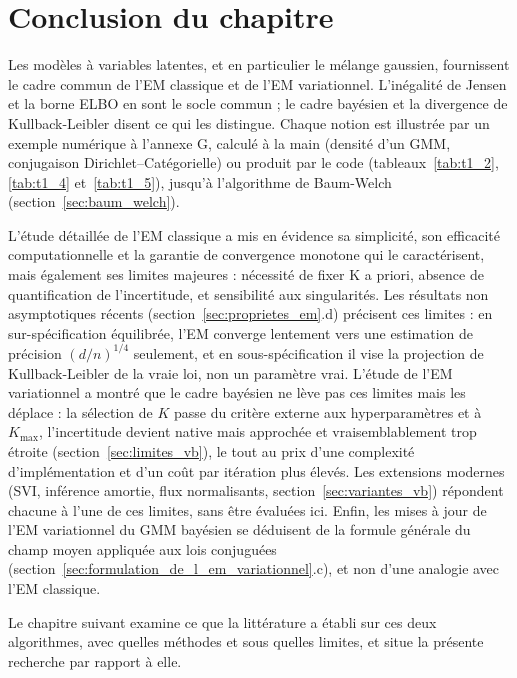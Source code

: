 \section{Conclusion du chapitre}\label{sec:conclusion_du_chapitre_1}
Les modèles à variables latentes, et en particulier le mélange gaussien, fournissent le cadre commun de l'EM classique et de l'EM variationnel. L'inégalité de Jensen et la borne ELBO en sont le socle commun ; le cadre bayésien et la divergence de Kullback-Leibler disent ce qui les distingue. Chaque notion est illustrée par un exemple numérique à l'annexe G, calculé à la main (densité d'un GMM, conjugaison Dirichlet--Catégorielle) ou produit par le code (tableaux~\ref{tab:t1_2}, \ref{tab:t1_4} et~\ref{tab:t1_5}), jusqu'à l'algorithme de Baum-Welch (section~\ref{sec:baum_welch}).

L'étude détaillée de l'EM classique a mis en évidence sa simplicité, son efficacité computationnelle et la garantie de convergence monotone qui le caractérisent, mais également ses limites majeures : nécessité de fixer K a priori, absence de quantification de l'incertitude, et sensibilité aux singularités. Les résultats non asymptotiques récents (section~\ref{sec:proprietes_em}.d) précisent ces limites : en sur-spécification équilibrée, l'EM converge lentement vers une estimation de précision $(d/n)^{1/4}$ seulement, et en sous-spécification il vise la projection de Kullback-Leibler de la vraie loi, non un paramètre vrai. L'étude de l'EM variationnel a montré que le cadre bayésien ne lève pas ces limites mais les déplace : la sélection de $K$ passe du critère externe aux hyperparamètres et à $K_{\max}$, l'incertitude devient native mais approchée et vraisemblablement trop étroite (section~\ref{sec:limites_vb}), le tout au prix d'une complexité d'implémentation et d'un coût par itération plus élevés. Les extensions modernes (SVI, inférence amortie, flux normalisants, section~\ref{sec:variantes_vb}) répondent chacune à l'une de ces limites, sans être évaluées ici. Enfin, les mises à jour de l'EM variationnel du GMM bayésien se déduisent de la formule générale du champ moyen appliquée aux lois conjuguées (section~\ref{sec:formulation_de_l_em_variationnel}.c), et non d'une analogie avec l'EM classique.

Le chapitre suivant examine ce que la littérature a établi sur ces deux algorithmes, avec quelles méthodes et sous quelles limites, et situe la présente recherche par rapport à elle.


